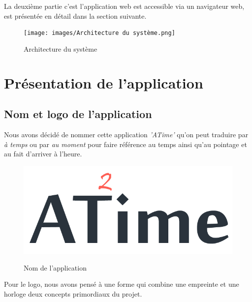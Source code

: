 La deuxième partie c’est l’application web est accessible via un navigateur
web, est présentée en détail dans la section suivante.

\vspace{10pt}
\begin{figure}[h!]
    \centering
    \texttt{[image: images/Architecture du système.png]}
    \label{fig84}
    \caption{Architecture du système}
    \label{figUFE}
\end{figure} 

\clearpage        
\section{Présentation de l'application}

\subsection{Nom et logo de l'application}
Nous avons décidé de nommer cette application \emph{'ATime'} qu’on peut traduire
par \emph{à temps} ou par \emph{au moment} pour faire référence au temps ainsi
qu’au pointage et au fait d'arriver à l'heure.

\begin{figure}[h!]
    \centering
    \includegraphics[scale=0.4 ]{images/app_name_dark.png}
    \label{fig85}
    \caption{Nom de l'application}
    \label{}
\end{figure} 

Pour le logo, nous avons pensé à une forme qui combine une empreinte et une 
horloge deux concepts primordiaux du projet.

